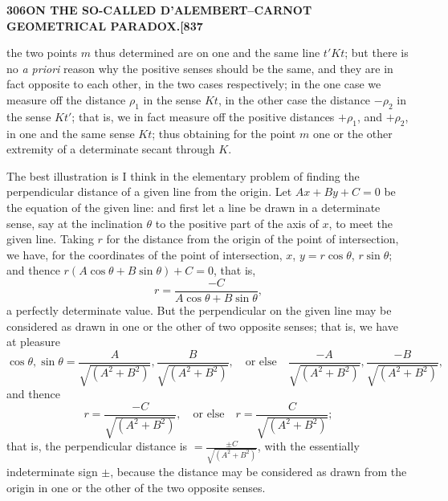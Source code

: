\documentclass[11pt,a4paper]{book}
\begin{document}
\newpage
\setcounter{page}{306}

\noindent\textbf{306}\hfill\textbf{ON THE SO-CALLED D'ALEMBERT--CARNOT GEOMETRICAL PARADOX.}\hfill\textbf{[837}

\bigskip

\noindent the two points $m$ thus determined are on one and the same line $t'Kt$; but there is no \textit{a priori} reason why the positive senses should be the same, and they are in fact opposite to each other, in the two cases respectively; in the one case we measure off the distance $\rho_1$ in the sense $Kt$, in the other case the distance $-\rho_2$ in the sense $Kt'$; that is, we in fact measure off the positive distances $+\rho_1$, and $+\rho_2$, in one and the same sense $Kt$; thus obtaining for the point $m$ one or the other extremity of a determinate secant through $K$.

The best illustration is I think in the elementary problem of finding the perpendicular distance of a given line from the origin. Let $Ax + By + C = 0$ be the equation of the given line: and first let a line be drawn in a determinate sense, say at the inclination $\theta$ to the positive part of the axis of $x$, to meet the given line. Taking $r$ for the distance from the origin of the point of intersection, we have, for the coordinates of the point of intersection, $x$, $y = r\cos\theta$, $r\sin\theta$; and thence $r(A\cos\theta + B\sin\theta) + C = 0$, that is,
\[
r = \frac{-C}{A\cos\theta + B\sin\theta},
\]
a perfectly determinate value. But the perpendicular on the given line may be considered as drawn in one or the other of two opposite senses; that is, we have at pleasure
\[
\cos\theta, \sin\theta = \frac{A}{\sqrt{(A^2 + B^2)}}, \frac{B}{\sqrt{(A^2 + B^2)}}, \quad \text{or else} \quad \frac{-A}{\sqrt{(A^2 + B^2)}}, \frac{-B}{\sqrt{(A^2 + B^2)}},
\]
and thence
\[
r = \frac{-C}{\sqrt{(A^2 + B^2)}}, \quad \text{or else} \quad r = \frac{C}{\sqrt{(A^2 + B^2)}};
\]
that is, the perpendicular distance is $= \frac{\pm C}{\sqrt{(A^2 + B^2)}}$, with the essentially indeterminate sign $\pm$, because the distance may be considered as drawn from the origin in one or the other of the two opposite senses.

\vspace{2em}


\newpage
\setcounter{page}{307}
\end{document}
